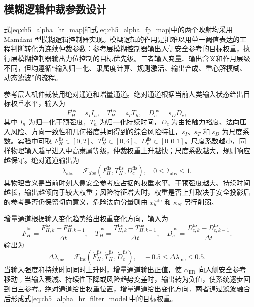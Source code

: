 \subsection{模糊逻辑仲裁参数设计}
\label{subsec:ch5_fuzzy_arbitration_design}

式\eqref{eq:ch5_alpha_hr_map}和式\eqref{eq:ch5_alpha_fp_map}中的两个映射均采用 Mamdani 型模糊逻辑控制器实现。模糊逻辑的作用是把难以用单一阈值表达的工程判断转化为连续仲裁参数：参考层模糊控制器输出人侧安全参考的目标权重，执行层模糊控制器输出力位控制的目标优先级。二者输入变量、输出含义和作用层级不同，但均遵循“输入归一化、隶属度计算、规则激活、输出合成、重心解模糊、动态滤波”的流程。

参考层人机仲裁使用绝对通道和增量通道。绝对通道根据当前人类输入状态给出目标权重水平，输入为
\begin{equation}
  F_H^{\mathrm{fis}}=s_I I_h,\quad
  T_H^{\mathrm{fis}}=s_T T_h,\quad
  D_c^{\mathrm{fis}}=s_D D_c ,
  \label{eq:ch5_hr_fis_inputs}
\end{equation}
其中 $I_h$ 为归一化干预强度，$T_h$ 为归一化持续时间，$D_c$ 为由接触力裕度、法向压入风险、方向一致性和几何裕度共同得到的综合风险特征，$s_I$、$s_T$ 和 $s_D$ 为尺度系数。实验中可取 $F_H^{\mathrm{fis}}\in[0,2]$、$T_H^{\mathrm{fis}}\in[0,6]$、$D_c^{\mathrm{fis}}\in[0,0.1]$。尺度系数越小，同样物理输入越早进入中高隶属等级，仲裁权重上升越快；尺度系数越大，规则响应越保守。绝对通道输出为
\begin{equation}
  \lambda_{\mathrm{abs}}=
  \mathcal F_{\mathrm{abs}}
  \left(F_H^{\mathrm{fis}},T_H^{\mathrm{fis}},D_c^{\mathrm{fis}}\right),
  \quad
  0\le \lambda_{\mathrm{abs}}\le 1 .
  \label{eq:ch5_hr_abs_channel}
\end{equation}
其物理含义是当前时刻人侧安全参考应占据的权重水平。干预强度越大、持续时间越长，输出越倾向于较大权重；风险特征增大时，权重是否上升取决于安全投影后的参考是否仍保留切向意义，危险法向分量则由 $x_h^{\mathrm{safe}}$ 和 $\kappa_N$ 另行削弱。

增量通道根据输入变化趋势给出权重变化方向，输入为
\begin{equation}
  \dot F_H^{\mathrm{fis}}=\frac{F_{H,k}^{\mathrm{fis}}-F_{H,k-1}^{\mathrm{fis}}}{\Delta t},
  \quad
  \dot T_H^{\mathrm{fis}}=\frac{T_{H,k}^{\mathrm{fis}}-T_{H,k-1}^{\mathrm{fis}}}{\Delta t},
  \quad
  \dot D_c^{\mathrm{fis}}=\frac{D_{c,k}^{\mathrm{fis}}-D_{c,k-1}^{\mathrm{fis}}}{\Delta t}.
  \label{eq:ch5_hr_inc_inputs}
\end{equation}
输出为
\begin{equation}
  \Delta\lambda_{\mathrm{inc}}=
  \mathcal F_{\mathrm{inc}}
  \left(\dot F_H^{\mathrm{fis}},\dot T_H^{\mathrm{fis}},\dot D_c^{\mathrm{fis}}\right),
  \quad
  -0.5\le \Delta\lambda_{\mathrm{inc}}\le 0.5 .
  \label{eq:ch5_hr_inc_channel}
\end{equation}
当输入强度和持续时间同时上升时，增量通道输出正值，使 $\alpha_{\mathrm{HR}}$ 向人侧安全参考移动；当输入衰减、持续性下降或风险趋势变差时，输出转为负值，使系统逐步回到自主参考。绝对通道给出权重位置，增量通道给出变化方向，两者通过滤波融合后形成式\eqref{eq:ch5_alpha_hr_filter_model}中的目标权重。

